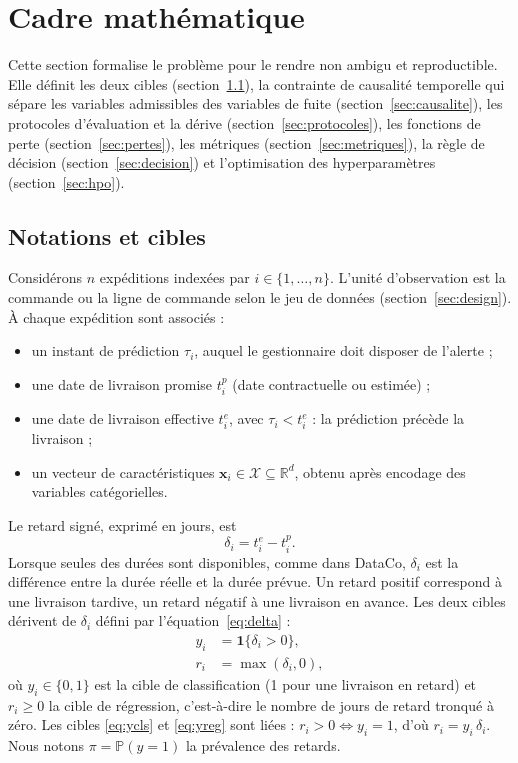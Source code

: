 \documentclass[11pt,a4paper]{article}
\newcommand{\Prob}{\mathbb{P}}
\newcommand{\ind}{\mathbf{1}}
\theoremstyle{definition}
\begin{document}
\section{Cadre mathématique}
\label{sec:formulation}

Cette section formalise le problème pour le rendre non ambigu et reproductible. Elle définit les deux cibles (section~\ref{sec:notations}), la contrainte de causalité temporelle qui sépare les variables admissibles des variables de fuite (section~\ref{sec:causalite}), les protocoles d'évaluation et la dérive (section~\ref{sec:protocoles}), les fonctions de perte (section~\ref{sec:pertes}), les métriques (section~\ref{sec:metriques}), la règle de décision (section~\ref{sec:decision}) et l'optimisation des hyperparamètres (section~\ref{sec:hpo}).

\subsection{Notations et cibles}
\label{sec:notations}

Considérons $n$ expéditions indexées par $i \in \{1,\dots,n\}$. L'unité d'observation est la commande ou la ligne de commande selon le jeu de données (section~\ref{sec:design}). À chaque expédition sont associés :
\begin{itemize}
  \item un instant de prédiction $\tau_i$, auquel le gestionnaire doit disposer de l'alerte ;
  \item une date de livraison promise $t_i^{p}$ (date contractuelle ou estimée) ;
  \item une date de livraison effective $t_i^{e}$, avec $\tau_i < t_i^{e}$ : la prédiction précède la livraison ;
  \item un vecteur de caractéristiques $\mathbf{x}_i \in \mathcal{X} \subseteq \mathbb{R}^{d}$, obtenu après encodage des variables catégorielles.
\end{itemize}
Le retard signé, exprimé en jours, est
\begin{equation}
  \delta_i = t_i^{e} - t_i^{p}.
  \label{eq:delta}
\end{equation}
Lorsque seules des durées sont disponibles, comme dans DataCo, $\delta_i$ est la différence entre la durée réelle et la durée prévue. Un retard positif correspond à une livraison tardive, un retard négatif à une livraison en avance. Les deux cibles dérivent de $\delta_i$ défini par l'équation~\eqref{eq:delta} :
\begin{align}
  y_i &= \ind\{\delta_i > 0\}, \label{eq:ycls}\\
  r_i &= \max(\delta_i, 0), \label{eq:yreg}
\end{align}
où $y_i \in \{0,1\}$ est la cible de classification (1 pour une livraison en retard) et $r_i \ge 0$ la cible de régression, c'est-à-dire le nombre de jours de retard tronqué à zéro. Les cibles \eqref{eq:ycls} et \eqref{eq:yreg} sont liées : $r_i > 0 \iff y_i = 1$, d'où $r_i = y_i\,\delta_i$. Nous notons $\pi = \Prob(y=1)$ la prévalence des retards.
\end{document}
